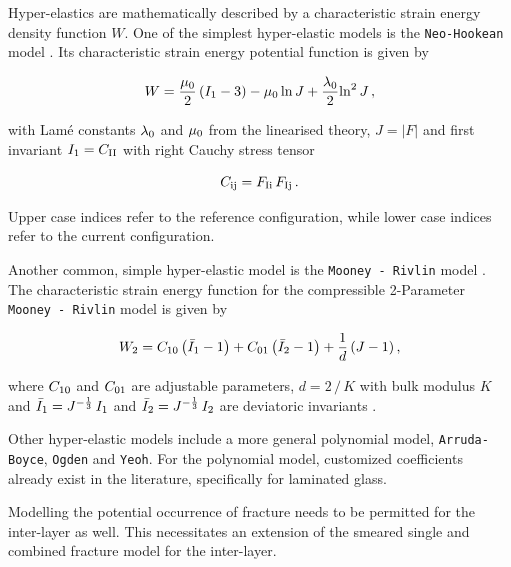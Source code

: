 \documentclass[12pt,twoside]{article}
\theoremstyle{break}
\begin{document}
Hyper-elastics are mathematically described by a characteristic strain energy density function $W$. One of the simplest hyper-elastic models is the \texttt{Neo-Hookean} model \cite{Gha15}. Its characteristic strain energy potential function is given by

\begin{equation}
    \label{eq:NeoHooke}
    W=\frac{\mu_{\rm{0}}}{2}\left(I_{\rm{1}}-3\right)-\mu_{\rm{0}}\,{\rm{ln}}\,J+\frac{\lambda_{\rm{0}}}{2}{\rm{ln}}^2\,J\,,
\end{equation}

with Lam\'{e} constants $\lambda_{\rm{0}}$ and $\mu_{\rm{0}}$ from the linearised theory, $J=\lvert F\rvert$ and first invariant $I_{\rm 1}=C_{\rm{II}}$ with right Cauchy stress tensor \cite{Gha15}

\begin{equation}
    C_{\rm{ij}}=F_{\rm{Ii}}\,F_{\rm{Ij}}\,.
\end{equation}

Upper case indices refer to the reference configuration, while lower case indices refer to the current configuration.

\bigbreak
Another common, simple hyper-elastic model is the \texttt{Mooney - Rivlin} model \cite{Aba13, Kum16}. The characteristic strain energy function for the compressible 2-Parameter \texttt{Mooney - Rivlin} model \cite{Kum16} is given by

\begin{equation}
    \label{eq:MooneyRivlinSEF}
    W_{\rm{2}} = C_{\rm{10}}\left(\bar{I}_{\rm{1}}-1\right)+C_{\rm{01}}\left(\bar{I}_{\rm{2}}-1\right)+\frac{1}{d}\,(J-1)\,,
\end{equation}

where $C_{\rm{10}}$ and $C_{\rm{01}}$ are adjustable parameters, $d=2\,/\,K$ with bulk modulus $K$ and $\bar{I}_{\rm{1}}=J^{-\frac{1}{3}}\,I_{\rm{1}}$ and $\bar{I}_{\rm{2}}=J^{-\frac{1}{3}}\,I_{\rm{2}}$ are deviatoric invariants \cite{Aba13}.

\bigbreak
Other hyper-elastic models \cite{Aba13} include a more general polynomial model, \texttt{Arruda-Boyce}, \texttt{Ogden} and \texttt{Yeoh}. For the polynomial model, customized coefficients \cite{Sam19} already exist in the literature, specifically for laminated glass.

\bigbreak
Modelling the potential occurrence of fracture needs to be permitted for the inter-layer as well. This necessitates an extension of the smeared single and combined fracture model for the inter-layer.
\end{document}
